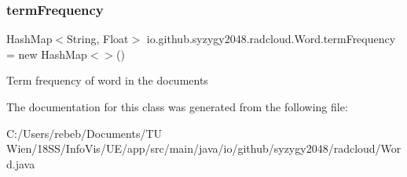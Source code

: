 \subsubsection{\texorpdfstring{term\+Frequency}{termFrequency}}
{\footnotesize\ttfamily Hash\+Map$<$String, Float$>$ io.\+github.\+syzygy2048.\+radcloud.\+Word.\+term\+Frequency = new Hash\+Map$<$$>$()\hspace{0.3cm}{\ttfamily [private]}}

Term frequency of word in the documents 

The documentation for this class was generated from the following file\+:\begin{DoxyCompactItemize}
\item 
C\+:/\+Users/rebeb/\+Documents/\+T\+U Wien/18\+S\+S/\+Info\+Vis/\+U\+E/app/src/main/java/io/github/syzygy2048/radcloud/Word.\+java\end{DoxyCompactItemize}
